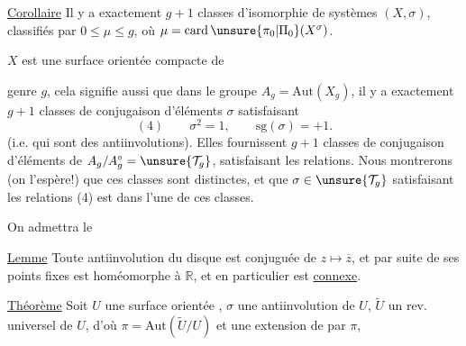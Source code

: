 
\uline{Corollaire} Il y a exactement $g+1$ classes d'isomorphie de systèmes $(X,\sigma)$, classifiés par $0\leq\mu\leq g$, où $\mu=\operatorname{card}\unsure{\pi_0|\Pi_0}(X^\sigma)$.


$X$  est une surface orientée compacte de



genre $g$, cela signifie aussi que dans le groupe $A_g=\mathrm{Aut}(X_g)$, il y a exactement $g+1$ classes de conjugaison d'éléments $\sigma$ satisfaisant
\[
(4)\qquad \sigma^2=1,\qquad \mathrm{sg}(\sigma)=+1.
\]
(i.e. qui sont des antiinvolutions). Elles fournissent $g+1$ classes de conjugaison d'éléments de $A_g/A_g^\circ=\unsure{\mathcal{T}_g}$, satisfaisant les  relations. Nous montrerons (on l'espère!) que ces classes sont distinctes, et que  $\sigma\in\unsure{\mathcal{T}_g}$ satisfaisant les relations (4) est dans l'une de ces classes.

On admettra le

\uline{Lemme} Toute antiinvolution du disque   est conjuguée de $z\mapsto\overline z$, et par suite  de ses points fixes est homéomorphe à $\mathbb R$, et en particulier est \uline{connexe}.

\uline{Théorème} Soit $U$ une surface orientée ,  $\sigma$ une antiinvolution de $U$, $\widetilde U$ un rev. universel de $U$, d'où $\pi=\mathrm{Aut}(\widetilde U/U)$ et une extension  de  par $\pi$, 
